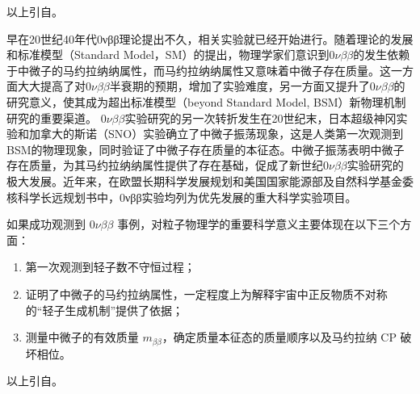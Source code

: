 \documentclass[type=master]{fduthesis}
\begin{document}
{\color{green} 以上引自}\cite{Ma2020Majorana}。

早在20世纪40年代0νββ理论提出不久，相关实验就已经开始进行。随着理论的发展和标准模型（Standard Model，SM）的提出，物理学家们意识到0$\nu\beta\beta$的发生依赖于中微子的马约拉纳纳属性，而马约拉纳纳属性又意味着中微子存在质量\cite{Schechter1982,Racah1937}。这一方面大大提高了对0$\nu\beta\beta$半衰期的预期，增加了实验难度，另一方面又提升了0$\nu\beta\beta$的研究意义，使其成为超出标准模型（beyond Standard Model, BSM）新物理机制研究的重要渠道。
0$\nu\beta\beta$实验研究的另一次转折发生在20世纪末，日本超级神冈实验\cite{Fukuda1998}和加拿大的斯诺（SNO）实验\cite{Ahmad2002}确立了中微子振荡现象，这是人类第一次观测到BSM的物理现象，同时验证了中微子存在质量的本征态。中微子振荡表明中微子存在质量，为其马约拉纳纳属性提供了存在基础，促成了新世纪0$\nu\beta\beta$实验研究的极大发展。近年来，在欧盟长期科学发展规划\cite{Bracco2017}和美国国家能源部及自然科学基金委核科学长远规划书\cite{Dodge2024}中，0νββ实验均列为优先发展的重大科学实验项目。

如果成功观测到 0$\nu\beta\beta$ 事例，对粒子物理学的重要科学意义主要体现在以下三个方面：
\begin{enumerate}
    \item 第一次观测到轻子数不守恒过程；
    \item 证明了中微子的马约拉纳属性，一定程度上为解释宇宙中正反物质不对称的“轻子生成机制”提供了依据\cite{CAS2020}；
    \item 测量中微子的有效质量 $m_{\beta\beta}$，确定质量本征态的质量顺序以及马约拉纳 CP 破坏相位。
\end{enumerate}

{\color{red} 以上引自}\cite{Wang2025}。
\end{document}
